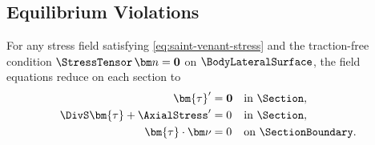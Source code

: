 \iffalse

\subsection{Equilibrium Violations}

For any stress field satisfying \eqref{eq:saint-venant-stress} and the traction-free condition \(\StressTensor\,\bm n=\mathbf{0}\) on \(\BodyLateralSurface\),
the field equations reduce on each section to
\begin{subequations}
\label{eq:sv-equilibrium}
\begin{align}
\bm{\tau}'&=\mathbf{0} && \text{in }\Section,\\
\DivS\bm{\tau}+\AxialStress'&=0 && \text{in }\Section, \label{eq:sv-axial-equilibrium}\\
\bm{\tau}\cdot\bm\nu&=0 && \text{on }\SectionBoundary.
\end{align}
\end{subequations}


